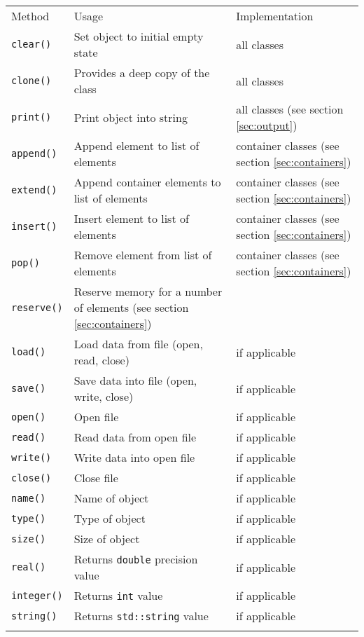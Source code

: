 \documentclass{article}[12pt,a4]
\begin{document}
\begin{center}
\begin{tabular}{lll}
\hline
\hline
\noalign{\smallskip}
Method & Usage & Implementation \\
\noalign{\smallskip}
\hline
\noalign{\smallskip}
{\tt clear()} & Set object to initial empty state & all classes \\
{\tt clone()} & Provides a deep copy of the class & all classes \\
{\tt print()} & Print object into string & all classes (see section \ref{sec:output}) \\
\noalign{\smallskip}
\hline
\noalign{\smallskip}
{\tt append()} & Append element to list of elements & container classes (see section \ref{sec:containers}) \\
{\tt extend()} & Append container elements to list of elements & container classes (see section \ref{sec:containers}) \\
{\tt insert()} & Insert element to list of elements & container classes (see section \ref{sec:containers}) \\
{\tt pop()} & Remove element from list of elements & container classes (see section \ref{sec:containers}) \\
{\tt reserve()} & Reserve memory for a number of elements (see section \ref{sec:containers}) \\
\noalign{\smallskip}
\hline
\noalign{\smallskip}
{\tt load()} & Load data from file (open, read, close) & if applicable \\
{\tt save()} & Save data into file (open, write, close) & if applicable \\
{\tt open()} & Open file & if applicable \\
{\tt read()} & Read data from open file & if applicable \\
{\tt write()} & Write data into open file & if applicable \\
{\tt close()} & Close file & if applicable \\
{\tt name()} & Name of object & if applicable \\
{\tt type()} & Type of object & if applicable \\
{\tt size()} & Size of object & if applicable \\
{\tt real()} & Returns {\tt double} precision value & if applicable \\
{\tt integer()} & Returns {\tt int} value & if applicable \\
{\tt string()} & Returns {\tt std::string} value & if applicable \\
\noalign{\smallskip}
\hline
\end{tabular}
\end{center}
\end{document}
